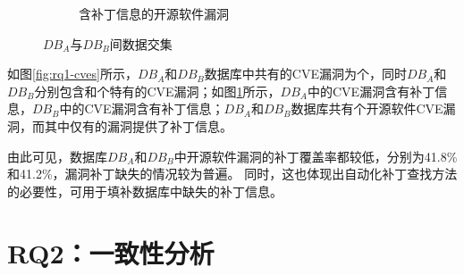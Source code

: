 \begin{figure}[h]
\begin{subfigure}[b]{0.45\textwidth}
    \caption{含补丁信息的开源软件漏洞}\label{fig:rq1-cves-with-patches}
    \end{subfigure}
    \caption{$DB_A$与$DB_B$间数据交集}\label{fig:intersection}
\end{figure}


如图\ref{fig:rq1-cves}所示，$DB_A$和$DB_B$数据库中共有的CVE漏洞为个，同时$DB_A$和$DB_B$分别包含和个特有的CVE漏洞；如图\ref{fig:rq1-cves-with-patches}所示，$DB_A$中的CVE漏洞含有补丁信息，$DB_B$中的CVE漏洞含有补丁信息；$DB_A$和$DB_B$数据库共有个开源软件CVE漏洞，而其中仅有的漏洞提供了补丁信息。



由此可见，数据库$DB_A$和$DB_B$中开源软件漏洞的补丁覆盖率都较低，分别为41.8\%和41.2\%，漏洞补丁缺失的情况较为普遍。%
同时，这也体现出自动化补丁查找方法的必要性，可用于填补数据库中缺失的补丁信息。


\section{RQ2：一致性分析}\label{sec:consistency}

